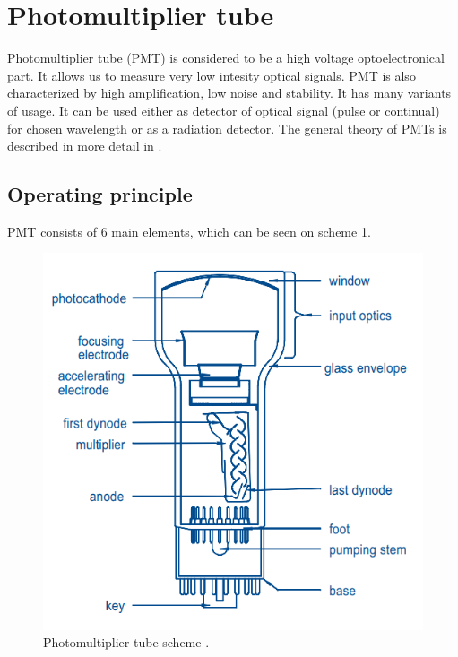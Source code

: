 \section{Photomultiplier tube}
Photomultiplier tube (PMT) is considered to be a high voltage optoelectronical part. It allows us to measure very low intesity optical signals. PMT is also characterized by high amplification, low noise and stability. It has many variants of usage. It can be used either as detector of optical signal (pulse or continual) for chosen wavelength or as a radiation detector. The general theory of PMTs is described in more detail in \cite{Photonis, Hamamatsu}. 
\subsection{Operating principle}
PMT consists of 6 main elements, which can be seen on scheme \ref{PMT scheme}.

\begin{figure}[H]
 \centering
 \includegraphics[scale = 0.5]{./pictures/PMTscheme}
 \caption{Photomultiplier tube scheme \cite{Photonis}.}
 \label{PMT scheme}
\end{figure}

